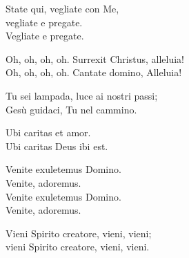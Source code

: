 \newpage


State qui, vegliate con Me,\\
vegliate e pregate.\\
Vegliate e pregate.

\spaziotaize


Oh, oh, oh, oh. Surrexit Christus, alleluia!\\
Oh, oh, oh, oh. Cantate domino, Alleluia!

\spaziotaize


Tu sei lampada, luce ai nostri passi;\\
Gesù guidaci, Tu nel cammino.

\spaziotaize


Ubi caritas et amor.\\
Ubi caritas Deus ibi est.

\spaziotaize


Venite exuletemus Domino.\\
Venite, adoremus.\\
Venite exuletemus Domino.\\
Venite, adoremus.

\spaziotaize


Vieni Spirito creatore, vieni, vieni;\\
vieni Spirito creatore, vieni, vieni.
